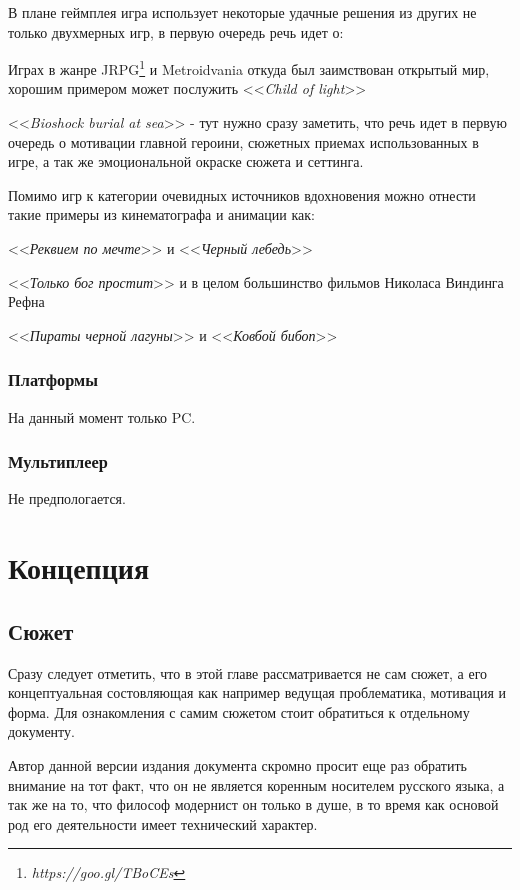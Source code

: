 \documentclass[11pt]{report}
\newenvironment{itemize*}%
  {\begin{itemize}%
    \setlength{\itemsep}{2pt}%
    \setlength{\parskip}{0.75pt}}%
  {\end{itemize}}
\begin{document}
В плане геймплея игра использует некоторые удачные решения из других не только двухмерных игр, в первую очередь речь идет о: \begin{itemize*}
\item Играх в жанре JRPG\footnote{\emph{https://goo.gl/TBoCEs}} и Metroidvania откуда был заимствован открытый мир, хорошим примером может послужить <<\textit{Child of light}>>
\item <<\textit{Bioshock burial at sea}>> - тут нужно сразу заметить, что речь идет в первую очередь о мотивации главной героини, сюжетных приемах использованных в игре, а так же эмоциональной окраске сюжета и сеттинга.
\end{itemize*} Помимо игр к категории очевидных источников вдохновения можно отнести такие примеры из кинематографа и анимации как: \begin{itemize*}
\item <<\textit{Реквием по мечте}>> и <<\textit{Черный лебедь}>>
\item <<\textit{Только бог простит}>> и в целом большинство фильмов Николаса Виндинга Рефна
\item <<\textit{Пираты черной лагуны}>> и <<\textit{Ковбой бибоп}>>\\
\end{itemize*}


\section{Платформы}
На данный момент только PC.

\section{Мультиплеер}
Не предпологается.

\part{Концепция}


\chapter{Сюжет}
Сразу следует отметить, что в этой главе рассматривается не сам сюжет, а его концептуальная состовляющая как например ведущая проблематика, мотивация и форма. Для ознакомления с самим сюжетом стоит обратиться к отдельному документу.

Автор данной версии издания документа скромно просит еще раз обратить внимание на тот факт, что он не является коренным носителем русского языка, а так же на то, что философ модернист он только в душе, в то время как основой род его деятельности имеет технический характер.
\end{document}
